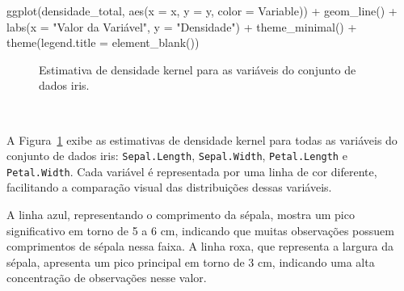 \documentclass[
  a4paperpaper,
]{article}
\newenvironment{Shaded}{\begin{snugshade}}{\end{snugshade}}
\newcommand{\AttributeTok}[1]{\textcolor[rgb]{0.40,0.45,0.13}{#1}}
\newcommand{\FunctionTok}[1]{\textcolor[rgb]{0.28,0.35,0.67}{#1}}
\newcommand{\NormalTok}[1]{\textcolor[rgb]{0.00,0.23,0.31}{#1}}
\newcommand{\SpecialCharTok}[1]{\textcolor[rgb]{0.37,0.37,0.37}{#1}}
\newcommand{\StringTok}[1]{\textcolor[rgb]{0.13,0.47,0.30}{#1}}
\begin{document}
\begin{Shaded}
\begin{Highlighting}[]
\FunctionTok{ggplot}\NormalTok{(densidade\_total, }\FunctionTok{aes}\NormalTok{(}\AttributeTok{x =}\NormalTok{ x, }\AttributeTok{y =}\NormalTok{ y, }\AttributeTok{color =}\NormalTok{ Variable)) }\SpecialCharTok{+}
  \FunctionTok{geom\_line}\NormalTok{() }\SpecialCharTok{+}
  \FunctionTok{labs}\NormalTok{(}\AttributeTok{x =} \StringTok{"Valor da Variável"}\NormalTok{,}
       \AttributeTok{y =} \StringTok{"Densidade"}\NormalTok{) }\SpecialCharTok{+}
  \FunctionTok{theme\_minimal}\NormalTok{() }\SpecialCharTok{+}
  \FunctionTok{theme}\NormalTok{(}\AttributeTok{legend.title =} \FunctionTok{element\_blank}\NormalTok{())}
\end{Highlighting}
\end{Shaded}

\begin{figure}[H]


\caption{\label{fig-densidadeiris}Estimativa de densidade kernel para as
variáveis do conjunto de dados iris.}

\end{figure}%

~

A Figura~\ref{fig-densidadeiris} exibe as estimativas de densidade
kernel para todas as variáveis do conjunto de dados iris:
\texttt{Sepal.Length}, \texttt{Sepal.Width}, \texttt{Petal.Length} e
\texttt{Petal.Width}. Cada variável é representada por uma linha de cor
diferente, facilitando a comparação visual das distribuições dessas
variáveis.

A linha azul, representando o comprimento da sépala, mostra um pico
significativo em torno de 5 a 6 cm, indicando que muitas observações
possuem comprimentos de sépala nessa faixa. A linha roxa, que representa
a largura da sépala, apresenta um pico principal em torno de 3 cm,
indicando uma alta concentração de observações nesse valor.
\end{document}
